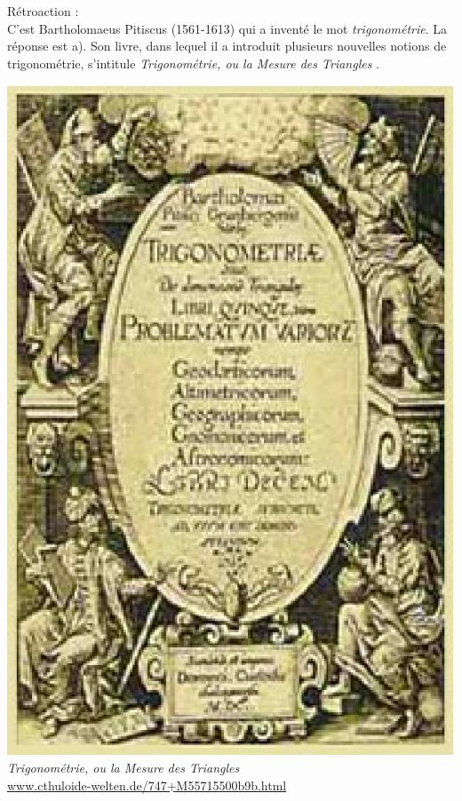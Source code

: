 \documentclass[letterpaper, 12pt]{article}
\begin{document}
R\'etroaction :\\
C'est Bartholomaeus Pitiscus (1561-1613) qui a invent\'e le mot \emph{trigonom\'etrie}. La r\'eponse est a). Son livre, dans lequel il a introduit plusieurs nouvelles notions de trigonom\'etrie, s'intitule \og \emph{Trigonom\'etrie, ou la Mesure des Triangles} \fg.
\begin{center}
\includegraphics[scale=0.39]{pitiscus.eps}\\
\emph{{\small Trigonom\'etrie, ou la Mesure des Triangles}}\\
\href{http://www.cthuloide-welten.de/747+M55715500b9b.html}{www.cthuloide-welten.de/747+M55715500b9b.html}\\[5mm]
\end{center}
\end{document}
